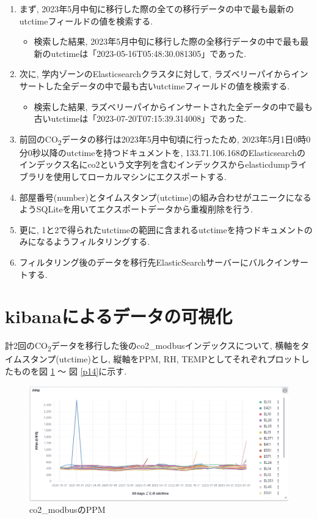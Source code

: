 \begin{enumerate}
  \item まず, 2023年5月中旬に移行した際の全ての移行データの中で最も最新のutctimeフィールドの値を検索する.
        \begin{itemize}
          \item 検索した結果, 2023年5月中旬に移行した際の全移行データの中で最も最新のutctimeは「2023-05-16T05:48:30.081305」であった.
        \end{itemize}
  \item 次に, 学内ゾーンのElasticsearchクラスタに対して, ラズベリーパイからインサートした全データの中で最も古いutctimeフィールドの値を検索する.
        \begin{itemize}
          \item 検索した結果, ラズベリーパイからインサートされた全データの中で最も古いutctimeは「2023-07-20T07:15:39.314008」であった.
        \end{itemize}
  \item 前回のCO\textsubscript{2}データの移行は2023年5月中旬頃に行ったため, 2023年5月1日0時0分0秒以降のutctimeを持つドキュメントを, 133.71.106.168のElasticsearchのインデックス名にco2という文字列を含むインデックスからelasticdumpライブラリを使用してローカルマシンにエクスポートする.
  \item 部屋番号(number)とタイムスタンプ(utctime)の組み合わせがユニークになるようSQLiteを用いてエクスポートデータから重複削除を行う.
  \item 更に, 1と2で得られたutctimeの範囲に含まれるutctimeを持つドキュメントのみになるようフィルタリングする.
  \item フィルタリング後のデータを移行先ElasticSearchサーバーにバルクインサートする.
\end{enumerate}

\section{kibanaによるデータの可視化}

計2回のCO\textsubscript{2}データを移行した後のco2\_modbusインデックスについて, 横軸をタイムスタンプ(utctime)とし, 縦軸をPPM, RH, TEMPとしてそれぞれプロットしたものを図 \ref{p12} 〜 図 \ref{p14}に示す.

\begin{figure}[h]
  \begin{center}
    \includegraphics[width=160mm]{sotu/figure/ppm.png}
    \caption{co2\_modbusのPPM}
    \label{p12}
  \end{center}
\end{figure}

